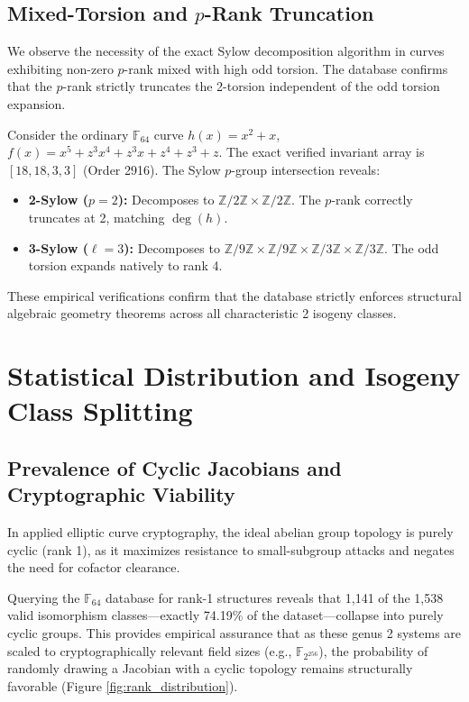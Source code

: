 \documentclass[letterpaper, 11pt]{article}
\begin{document}
\subsection{Mixed-Torsion and \texorpdfstring{$p$}{p}-Rank Truncation}
We observe the necessity of the exact Sylow decomposition algorithm in curves exhibiting non-zero $p$-rank mixed with high odd torsion. The database confirms that the $p$-rank strictly truncates the 2-torsion independent of the odd torsion expansion.

Consider the ordinary $\mathbb{F}_{64}$ curve $h(x) = x^2 + x$, $f(x) = x^5 + z^3x^4 + z^3x + z^4 + z^3 + z$. The exact verified invariant array is $[18, 18, 3, 3]$ (Order 2916). The Sylow $p$-group intersection reveals:
\begin{itemize}
    \item \textbf{2-Sylow ($p=2$):} Decomposes to $\mathbb{Z}/2\mathbb{Z} \times \mathbb{Z}/2\mathbb{Z}$. The $p$-rank correctly truncates at 2, matching $\deg(h)$.
    \item \textbf{3-Sylow ($\ell = 3$):} Decomposes to $\mathbb{Z}/9\mathbb{Z} \times \mathbb{Z}/9\mathbb{Z} \times \mathbb{Z}/3\mathbb{Z} \times \mathbb{Z}/3\mathbb{Z}$. The odd torsion expands natively to rank 4.
\end{itemize}
These empirical verifications confirm that the database strictly enforces structural algebraic geometry theorems across all characteristic 2 isogeny classes.

\section{Statistical Distribution and Isogeny Class Splitting}

\subsection{Prevalence of Cyclic Jacobians and Cryptographic Viability}
In applied elliptic curve cryptography, the ideal abelian group topology is purely cyclic (rank 1), as it maximizes resistance to small-subgroup attacks and negates the need for cofactor clearance. 

Querying the $\mathbb{F}_{64}$ database for rank-1 structures reveals that 1,141 of the 1,538 valid isomorphism classes---exactly 74.19\% of the dataset---collapse into purely cyclic groups. This provides empirical assurance that as these genus 2 systems are scaled to cryptographically relevant field sizes (e.g., $\mathbb{F}_{2^{256}}$), the probability of randomly drawing a Jacobian with a cyclic topology remains structurally favorable (Figure \ref{fig:rank_distribution}).
\end{document}
